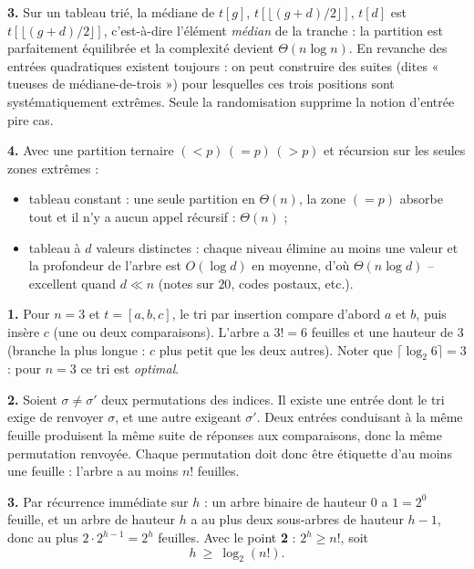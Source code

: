 \documentclass[11pt,a4paper]{article}
\begin{document}
\textbf{3.} Sur un tableau trié, la médiane de $t[g]$, $t[\lfloor(g+d)/2\rfloor]$,
$t[d]$ est $t[\lfloor(g+d)/2\rfloor]$, c'est-à-dire l'élément \emph{médian} de la
tranche : la partition est parfaitement équilibrée et la complexité devient
$\Theta(n\log n)$. En revanche des entrées quadratiques existent toujours : on peut
construire des suites (dites « tueuses de médiane-de-trois ») pour lesquelles ces trois
positions sont systématiquement extrêmes. Seule la randomisation supprime la notion
d'entrée pire cas.

\textbf{4.} Avec une partition ternaire $(<p)\,(=p)\,(>p)$ et récursion sur les seules
zones extrêmes :
\begin{itemize}[leftmargin=*,itemsep=1pt]
  \item tableau constant : une seule partition en $\Theta(n)$, la zone $(=p)$ absorbe
        tout et il n'y a aucun appel récursif : $\boxed{\Theta(n)}$ ;
  \item tableau à $d$ valeurs distinctes : chaque niveau élimine au moins une valeur et
        la profondeur de l'arbre est $O(\log d)$ en moyenne, d'où $\Theta(n\log d)$ --
        excellent quand $d\ll n$ (notes sur $20$, codes postaux, etc.).
\end{itemize}


\reponse
\textbf{1.} Pour $n=3$ et $t=[a,b,c]$, le tri par insertion compare d'abord $a$ et $b$,
puis insère $c$ (une ou deux comparaisons). L'arbre a $3!=6$ feuilles et une hauteur
de $3$ (branche la plus longue : $c$ plus petit que les deux autres).
Noter que $\lceil\log_2 6\rceil = 3$ : pour $n=3$ ce tri est \emph{optimal}.

\textbf{2.} Soient $\sigma\ne\sigma'$ deux permutations des indices. Il existe une entrée
dont le tri exige de renvoyer $\sigma$, et une autre exigeant $\sigma'$. Deux entrées
conduisant à la même feuille produisent la même suite de réponses aux comparaisons, donc
la même permutation renvoyée. Chaque permutation doit donc être étiquette d'au moins une
feuille : l'arbre a au moins $n!$ feuilles.

\textbf{3.} Par récurrence immédiate sur $h$ : un arbre binaire de hauteur $0$ a $1=2^0$
feuille, et un arbre de hauteur $h$ a au plus deux sous-arbres de hauteur $h-1$, donc au
plus $2\cdot2^{h-1}=2^{h}$ feuilles. Avec le point \textbf{2} : $2^{h}\ge n!$, soit
\[
  h\ \ge\ \log_2(n!).
\]
\end{document}
